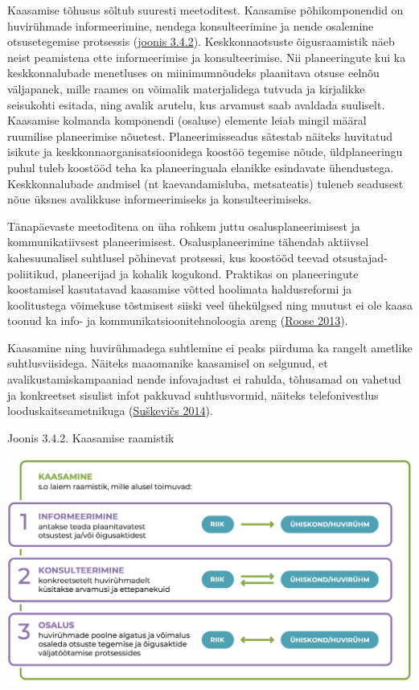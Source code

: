 \documentclass[estonian,]{article}
\begin{document}
Kaasamise tõhusus sõltub suuresti meetoditest. Kaasamise põhikomponendid on huvirühmade informeerimine, nendega konsulteerimine ja nende osalemine otsusetegemise protsessis (\protect\hyperlink{figure342}{joonis 3.4.2}). Keskkonnaotsuste õigusraamistik näeb neist peamistena ette informeerimise ja konsulteerimise. Nii planeeringute kui ka keskkonnalubade menetluses on miinimumnõudeks plaanitava otsuse eelnõu väljapanek, mille raames on võimalik materjalidega tutvuda ja kirjalikke seisukohti esitada, ning avalik arutelu, kus arvamust saab avaldada suuliselt.
Kaasamise kolmanda komponendi (osaluse) elemente leiab mingil määral ruumilise planeerimise nõuetest. Planeerimisseadus sätestab näiteks huvitatud isikute ja keskkonnaorganisatsioonidega koostöö tegemise nõude, üldplaneeringu puhul tuleb koostööd teha ka planeeringuala elanikke esindavate ühendustega. Keskkonnalubade andmisel (nt kaevandamisluba, metsateatis) tuleneb seadusest nõue üksnes avalikkuse informeerimiseks ja konsulteerimiseks.

Tänapäevaste meetoditena on üha rohkem juttu osalusplaneerimisest ja kommunikatiivsest planeerimisest. Osalusplaneerimine tähendab aktiivsel kahesuunalisel suhtlusel põhinevat protsessi, kus koostööd teevad otsustajad-poliitikud, planeerijad ja kohalik kogukond. Praktikas on planeeringute koostamisel kasutatavad kaasamise võtted hoolimata haldusreformi ja koolitustega võimekuse tõstmisest siiski veel ühekülgsed ning muutust ei ole kaasa toonud ka info- ja kommunikatsioonitehnoloogia areng (\protect\hyperlink{Roose2013}{Roose 2013}).

Kaasamine ning huvirühmadega suhtlemine ei peaks piirduma ka rangelt ametlike suhtlusviisidega. Näiteks maaomanike kaasamisel on selgunud, et avalikustamiskampaaniad nende infovajadust ei rahulda, tõhusamad on vahetud ja konkreetset sisulist infot pakkuvad suhtlusvormid, näiteks telefonivestlus looduskaitseametnikuga (\protect\hyperlink{Suux161keviux10ds2014}{Suškevičs 2014}).

{Joonis 3.4.2.} Kaasamise raamistik

\begin{center}\includegraphics[width=0.9\linewidth]{figures/3-chapter/fig342} \end{center}
\end{document}
